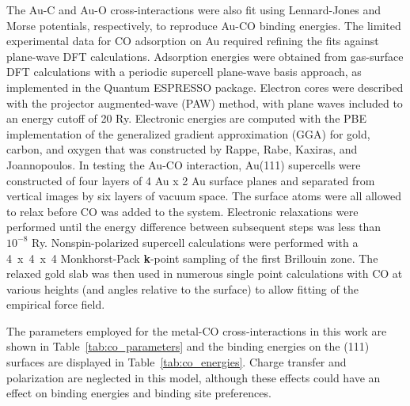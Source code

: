 The Au-C and Au-O cross-interactions were also fit using Lennard-Jones and
Morse potentials, respectively, to reproduce Au-CO binding energies.
The limited experimental data for CO adsorption on Au required refining the fits against plane-wave DFT calculations.
Adsorption energies were obtained from gas-surface DFT calculations with a
periodic supercell plane-wave basis approach, as implemented in the
Quantum ESPRESSO package.\citep{Giannozzi:2009fe} Electron cores were
described with the projector augmented-wave (PAW)
method,\citep{Blochl:1994vf, Kresse:1999by} with plane waves
included to an energy cutoff of 20 Ry. Electronic energies are
computed with the PBE implementation of the generalized gradient
approximation (GGA) for gold, carbon, and oxygen that was constructed
by Rappe, Rabe, Kaxiras, and Joannopoulos.\citep{Perdew:1996fq, Rappe:1990tw}
In testing the Au-CO interaction, Au(111) supercells were constructed of four layers of 4
Au x 2 Au surface planes and separated from vertical images by six
layers of vacuum space. The surface atoms were all allowed to relax 
before CO was added to the system. Electronic relaxations were 
performed until the energy difference between subsequent steps 
was less than $10^{-8}$ Ry.   Nonspin-polarized supercell calculations 
were performed with a 4~x~4~x~4 Monkhorst-Pack {\bf k}-point sampling of the first Brillouin
zone.\citep{Monkhorst:1976il} The relaxed gold slab was
then used in numerous single point calculations with CO at various
heights (and angles relative to the surface) to allow fitting of the
empirical force field.

The parameters employed for the metal-CO cross-interactions in this work 
are shown in Table~\ref{tab:co_parameters} and the binding energies on the 
(111) surfaces are displayed in Table~\ref{tab:co_energies}.  Charge transfer
and polarization are neglected in this model, although these effects could have 
an effect on binding energies and binding site preferences.

